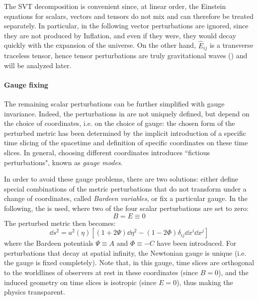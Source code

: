 The SVT decomposition is convenient since, at linear order, the Einstein equations for scalars, vectors and tensors do not mix and can therefore be treated separately. In particular, in the following vector perturbations are ignored, since they are not produced by Inflation, and even if they were, they would decay quickly with the expansion of the universe. On the other hand, $ \hat E_{ij} $ is a transverse traceless tensor, hence tensor perturbations are truly gravitational waves () and will be analyzed later.

\paragraph{Gauge fixing}

The remaining scalar perturbations can be further simplified with gauge invariance. Indeed, the perturbations in  are not uniquely defined, but depend on the choice of coordinates, i.e. on the choice of gauge: the chosen form of the perturbed metric has been determined by the implicit introduction of a specific time slicing of the spacetime and definition of specific coordinates on these time slices.
In general, choosing different coordinates introduces ``fictious perturbations", known as \emph{gauge modes}.

In order to avoid these gauge problems, there are two solutions: either define special combinations of the metric perturbations that do not transform under a change of coordinates, called \emph{Bardeen variables}, or fix a particular gauge. In the following, the  is used, where two of the four scalar perturbations are set to zero:
\begin{equation}
  B = E \equiv 0
\end{equation}
The perturbed metric then becomes:
\begin{equation}
  \dd s^2 = a^2(\eta) \left[ \left( 1 + 2 \Psi \right) \dd \eta^2 - \left( 1 - 2 \Phi \right) \delta_{ij} \dd x^i \dd x^j \right]
  \label{eq:perturbed-metric}
\end{equation}
where the Bardeen potentials $ \Psi \equiv A $ and $ \Phi \equiv - C $ have been introduced. For perturbations that decay at spatial infinity, the Newtonian gauge is unique (i.e. the gauge is fixed completely). Note that, in this gauge, time slices are orthogonal to the worldlines of observers at rest in these coordinates (since $ B = 0 $), and the induced geometry on time slices is isotropic (since $ E = 0 $), thus making the physics transparent.

